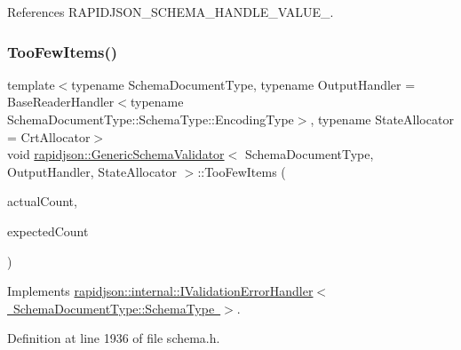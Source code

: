 References R\+A\+P\+I\+D\+J\+S\+O\+N\+\_\+\+S\+C\+H\+E\+M\+A\+\_\+\+H\+A\+N\+D\+L\+E\+\_\+\+V\+A\+L\+U\+E\+\_\+.

\mbox{\label{classrapidjson_1_1_generic_schema_validator_a96614fd25cd28294486f9212d49807eb}} 
\subsubsection{\texorpdfstring{TooFewItems()}{TooFewItems()}}
{\footnotesize\ttfamily template$<$typename Schema\+Document\+Type, typename Output\+Handler = Base\+Reader\+Handler$<$typename Schema\+Document\+Type\+::\+Schema\+Type\+::\+Encoding\+Type$>$, typename State\+Allocator = Crt\+Allocator$>$ \\
void \mbox{\hyperlink{classrapidjson_1_1_generic_schema_validator}{rapidjson\+::\+Generic\+Schema\+Validator}}$<$ Schema\+Document\+Type, Output\+Handler, State\+Allocator $>$\+::Too\+Few\+Items (\begin{DoxyParamCaption}\item[{\mbox{\hyperlink{namespacerapidjson_a44eb33eaa523e36d466b1ced64b85c84}{Size\+Type}}}]{actual\+Count,  }\item[{\mbox{\hyperlink{namespacerapidjson_a44eb33eaa523e36d466b1ced64b85c84}{Size\+Type}}}]{expected\+Count }\end{DoxyParamCaption})\hspace{0.3cm}{\ttfamily [virtual]}}



Implements \mbox{\hyperlink{classrapidjson_1_1internal_1_1_i_validation_error_handler_af86dfc82e6b4bd727ef69fba728dd8e4}{rapidjson\+::internal\+::\+I\+Validation\+Error\+Handler$<$ Schema\+Document\+Type\+::\+Schema\+Type $>$}}.



Definition at line 1936 of file schema.\+h.


